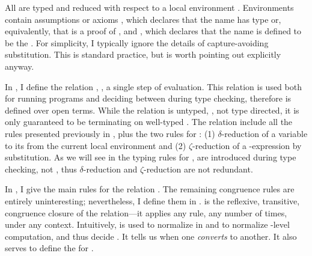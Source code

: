 All  are typed and reduced with respect to a local environment
\im{\slenv}.
Environments contain assumptions or axioms \im{\sx : \sA}, which declares that
the name \im{\sx} has type \im{\sA} or, equivalently, that \im{\sx} is a proof
of \im{\sA}, and  \im{\sx = \se}, which
declares that the name \im{\sx} is defined to be the  \im{\se}.
For simplicity, I typically ignore the details of capture-avoiding substitution.
This is standard practice, but is worth pointing out explicitly anyway.

\FigECCRed
In , I define the  relation
\im{\sstepjudg{\slenv}{\se}{\sepr}}, \ie, a single step of evaluation.
This  relation is used both for running programs and deciding
 between  during type checking, therefore
 is defined over open terms.
While the  relation is untyped, \ie, not type directed, it is
only guaranteed to be terminating on well-typed .
The  relation include all the  rules
presented previously in , plus the two 
rules for : (1) \(\delta\)-reduction of a variable to its
 from the current local environment and (2) \(\zeta\)-reduction
of a -expression by substitution.
As we will see in the typing rules for ,  are
introduced during type checking, not , thus \(\delta\)-reduction
and \(\zeta\)-reduction are not redundant.

\FigECCConv
In , I give the main rules for the 
relation \im{\sstepjudg[\stepstar]{\slenv}{\se}{\sepr}}.
The remaining congruence rules are entirely uninteresting; nevertheless, I
define them in .
 is the
reflexive, transitive, congruence closure of the  relation---it
applies any  rule, any number of times, under any context.
Intuitively,  is used to normalize  in
 and to normalize -level computation, and thus decide
 .
It tells us when one  \emph{converts} to another.
It also serves to define the  for \slang.

